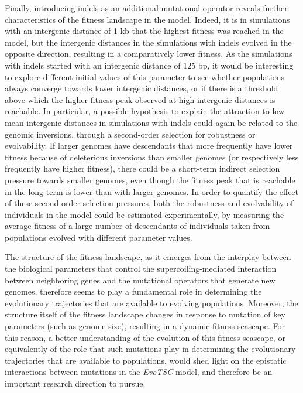 Finally, introducing indels as an additional mutational operator reveals further characteristics of the fitness landscape in the model.
Indeed, it is in simulations with an intergenic distance of 1 kb that the highest fitness was reached in the model, but the intergenic distances in the simulations with indels evolved in the opposite direction, resulting in a comparatively lower fitness.
As the simulations with indels started with an intergenic distance of 125 bp, it would be interesting to explore different initial values of this parameter to see whether populations always converge towards lower intergenic distances, or if there is a threshold above which the higher fitness peak observed at high intergenic distances is reachable.
In particular, a possible hypothesis to explain the attraction to low mean intergenic distances in simulations with indels could again be related to the genomic inversions, through a second-order selection for robustness or evolvability.
If larger genomes have descendants that more frequently have lower fitness because of deleterious inversions than smaller genomes (or respectively less frequently have higher fitness), there could be a short-term indirect selection pressure towards smaller genomes, even though the fitness peak that is reachable in the long-term is lower than with larger genomes.
In order to quantify the effect of these second-order selection pressures, both the robustness and evolvability of individuals in the model could be estimated experimentally, by measuring the average fitness of a large number of descendants of individuals taken from populations evolved with different parameter values.

The structure of the fitness landscape, as it emerges from the interplay between the biological parameters that control the supercoiling-mediated interaction between neighboring genes and the mutational operators that generate new genomes, therefore seems to play a fundamental role in determining the evolutionary trajectories that are available to evolving populations.
Moreover, the structure itself of the fitness landscape changes in response to mutation of key parameters (such as genome size), resulting in a dynamic fitness seascape.
For this reason, a better understanding of the evolution of this fitness seascape, or equivalently of the role that such mutations play in determining the evolutionary trajectories that are available to populations, would shed light on the epistatic interactions between mutations in the \emph{EvoTSC} model, and therefore be an important research direction to pursue.

